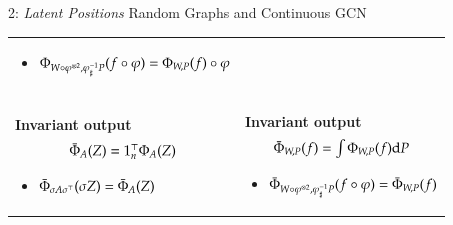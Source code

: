\documentclass[final,dvipsnames]{beamer}
\newcommand{\vsp}{\vspace{10pt}}
\begin{document}
\begin{frame}{}
\begin{columns}[t]
\begin{column}{0.45\linewidth}
\begin{block}{2: \emph{Latent Positions} Random Graphs and Continuous GCN}
\begin{table}
\begin{tabular}{p{\lsi\textwidth}|p{\rsi\textwidth}}
\parbox{\lsi\textwidth}{\normalsize
\vsp
\begin{itemize}
\item $\Phi_{W \circ \varphi^{\otimes 2}, \varphi^{-1}_\sharp P}(f \circ \varphi) = \Phi_{W,P}(f) \circ \varphi$
\end{itemize}
\vsp
}
\\
\hdashline
\textbf{Invariant output}
\begin{equation*}
\mathsmaller{\gcninv_A(Z) = 1_n^\top \gcneq_A(Z)}
\end{equation*}

\parbox{\lsi\textwidth}{\normalsize
\vsp
\begin{itemize}
\item $\bar{\Phi}_{\sigma A \sigma^\top}(\sigma Z) = \bar{\Phi}_A(Z)$
\end{itemize}
}
&
\textbf{Invariant output}
\begin{equation*}
\mathsmaller{\gcninv_{W,P}(f) = \int \cgcneq_{W,P}(f) \mathrm{d}P}
\end{equation*}

\parbox{\lsi\textwidth}{\normalsize
\vsp
\begin{itemize}
\item $\bar{\Phi}_{W \circ \varphi^{\otimes 2}, \varphi^{-1}_\sharp P}(f \circ \varphi) = \bar{\Phi}_{W,P}(f)$
\end{itemize}
}
\\

\end{tabular}
\end{table}


\end{block}
\end{column}
\end{columns}
\end{frame}
\end{document}
